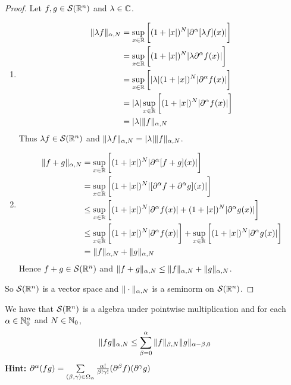 \documentclass{book}
\begin{document}
	\begin{proof} Let $f, g \in \mathcal{S}(\mathbb{R}^n)$ and $\lambda \in \mathbb{C}$.
		\begin{enumerate}
			\item 
			\begin{align*}
				\|\lambda f\|_{\alpha, N}
				& = \sup_{x \in \mathbb{R}} \bigg[  (1 + |x|)^N |\partial^{\alpha}[\lambda f] (x)| \bigg] \\
				& = \sup_{x \in \mathbb{R}} \bigg[  (1 + |x|)^N |\lambda \partial^{\alpha}f (x)| \bigg] \\
				& = \sup_{x \in \mathbb{R}} \bigg[  |\lambda| (1 + |x|)^N | \partial^{\alpha}f (x)| \bigg] \\
				& = |\lambda| \sup_{x \in \mathbb{R}} \bigg[ (1 + |x|)^N | \partial^{\alpha}f (x)| \bigg] \\
				& = |\lambda | \|f\|_{\alpha, N}
			\end{align*}
			Thus $\lambda f \in \mathcal{S}(\mathbb{R}^n)$ and $\|\lambda f\|_{\alpha, N} = |\lambda | \|f\|_{\alpha, N}$.
		\item \begin{align*}
			\|f  +  g\|_{\alpha, N} 
			& = \sup_{x \in \mathbb{R}} \bigg[  (1 + |x|)^N |\partial^{\alpha}[f + g] (x)| \bigg] \\
			& = \sup_{x \in \mathbb{R}} \bigg[  (1 + |x|)^N |[\partial^{\alpha} f  + \partial^{\alpha} g] (x)| \bigg] \\
			& \leq \sup_{x \in \mathbb{R}} \bigg[  (1 + |x|)^N |\partial^{\alpha} f (x)|  +  (1 + |x|)^N |\partial^{\alpha} g (x)| \bigg] \\
			& \leq \sup_{x \in \mathbb{R}} \bigg[  (1 + |x|)^N |\partial^{\alpha} f (x)| \bigg]   + \sup_{x \in \mathbb{R}} \bigg[ (1 + |x|)^N |\partial^{\alpha} g (x)| \bigg] \\
			& = \|f\|_{\alpha, N} + \|g\|_{\alpha, N} 
		\end{align*}
	 	Hence $f + g \in \mathcal{S}(\mathbb{R}^n)$ and $\|f + g\|_{\alpha, N} \leq \|f\|_{\alpha, N} + \|g\|_{\alpha, N}$.
		\end{enumerate}
		So $\mathcal{S}(\mathbb{R}^n)$ is a vector space and $\| \cdot \|_{\alpha, N}$ is a seminorm on $\mathcal{S}(\mathbb{R}^n)$.
	\end{proof}

	\begin{ex}
		We have that $\mathcal{S}(\mathbb{R}^n)$ is a algebra under pointwise multiplication and for each $\alpha \in \mathbb{N}_0^n$ and $N \in  \mathbb{N}_0$, 
		$$\|fg\|_{\alpha, N} \leq \sum\limits_{\beta=0}^\alpha  \|f\|_{\beta, N} \|g\|_{\alpha - \beta, 0}$$
		\textbf{Hint:} $\partial^{\alpha}(fg) = \sum\limits_{(\beta, \gamma) \in \Omega_{\alpha}} \frac{\alpha!}{\beta! \gamma!}(\partial^{\beta}f) (\partial^{\gamma}g)$
	\end{ex}
\end{document}

